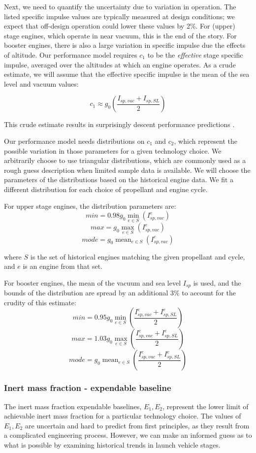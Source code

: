 \documentclass[conf]{../paper/new-aiaa}
\DeclareMathOperator*{\mean}{mean}
\begin{document}
Next, we need to quantify the uncertainty due to variation in operation. The listed specific impulse values are typically measured at design conditions; we expect that off-design operation could lower these values by 2\%. For  (upper) stage engines, which operate in near vacuum, this is the end of the story. For booster engines, there is also a large variation in specific impulse due the effects of altitude. Our performance model requires $c_1$ to be the \emph{effective}  stage specific impulse, averaged over the altitudes at which an engine operates. As a crude estimate, we will assume that the effective specific impulse is the mean of the sea level and vacuum values:

\[
    c_1 \approx g_0 \left( \frac{I_{sp, vac} + I_{sp, SL}}{2} \right)
\]

This crude estimate results in surprisingly descent performance predictions \cite{Alber2012}. 

Our performance model needs distributions on $c_1$ and $c_2$, which represent the possible variation in those parameters for a given technology choice. We arbitrarily choose to use triangular distributions, which are commonly used as a rough guess description when limited sample data is available. We will choose the parameters of the distributions based on the historical engine data. We fit a different distribution for each choice of propellant and engine cycle.

For upper stage engines, the distribution parameters are:
\[
 min = 0.98 g_0 \min_{e \in S}(I_{sp, vac}^{e})
\]
\[
 max = g_0 \max_{e \in S}(I_{sp, vac}^{e})
\]
\[
 mode = g_0 \mean_{e \in S}(I_{sp, vac}^{e})
\]

where $S$ is the set of historical engines matching the given propellant and cycle, and $e$ is an engine from that set.

For booster engines, the mean of the vacuum and sea level $I_{sp}$ is used, and the bounds of the distribution are spread by an additional 3\% to account for the crudity of this estimate:
\[
 min = 0.95 g_0 \min_{e \in S}\left( \frac{I_{sp, vac}^e + I_{sp, SL}^e}{2} \right)
\]
\[
 max = 1.03 g_0 \max_{e \in S}\left( \frac{I_{sp, vac}^e + I_{sp, SL}^e}{2} \right)
\]
\[
 mode = g_0 \mean_{e \in S}\left( \frac{I_{sp, vac}^e + I_{sp, SL}^e}{2} \right)
\]

\subsubsection{Inert mass fraction - expendable baseline}
The inert mass fraction expendable baselines, $E_1, E_2$, represent the lower limit of achievable inert mass fraction for a particular technology choice.
The values of $E_1, E_2$ are uncertain and hard to predict from first principles, as they result from a complicated engineering process. However, we can make an informed guess as to what is possible by examining historical trends in launch vehicle stages.
\end{document}
